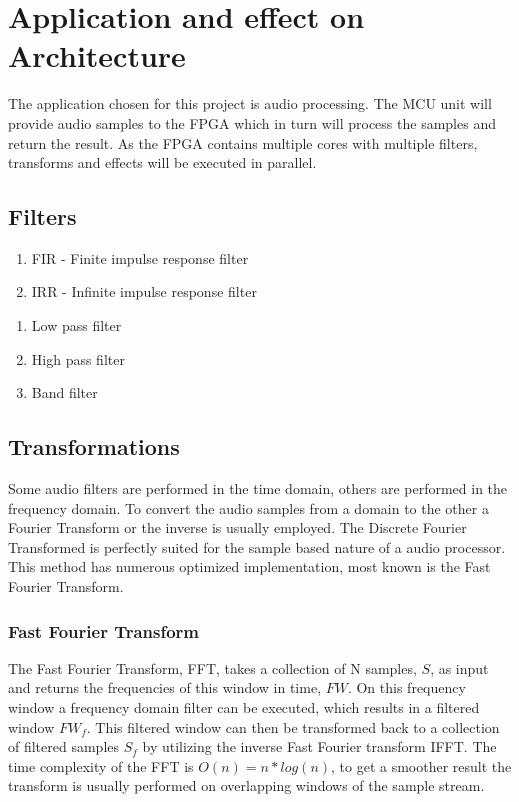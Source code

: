 \section{Application and effect on Architecture}


The application chosen for this project is audio processing. The MCU unit will
provide audio samples to the FPGA which in turn will process the samples and
return the result. As the FPGA contains multiple cores with multiple filters,
transforms and effects will be executed in parallel.

\subsection{Filters}

\begin{enumerate}
	\item FIR - Finite impulse response filter
	\item IRR - Infinite impulse response filter
\end{enumerate}

\begin{enumerate}
	\item Low pass filter
	\item High pass filter
	\item Band filter
\end{enumerate}

\subsection{Transformations}
Some audio filters are performed in the time domain, others are performed in the
frequency domain.  To convert the audio samples from a domain
to the other a Fourier Transform or the inverse is usually employed. The
Discrete Fourier Transformed  is perfectly suited for the sample based
nature of a audio processor. This method has numerous optimized implementation,
most known is the Fast Fourier Transform.

\subsubsection{Fast Fourier Transform}
The Fast Fourier Transform, FFT, takes a collection of N samples, $S$, as input
and returns the frequencies of this window in time, $FW$. On this frequency
window a frequency domain filter can be executed, which results in a filtered
window $FW_f$. This filtered window can then be transformed back to a collection
of filtered samples $S_f$ by utilizing the inverse Fast Fourier transform IFFT.
The time complexity of the FFT is $O(n) = n*log(n)$, to get a smoother result
the transform is usually performed on overlapping windows of the sample stream.

